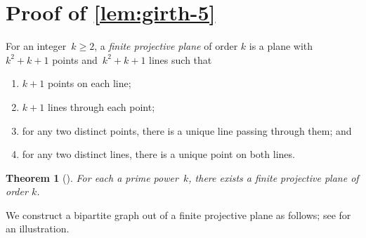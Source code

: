 \documentclass[a4paper,cleveref, autoref, 11pt, fleqn, thm-restate]{article}
\theoremstyle{plain}
\newtheorem{theorem}{Theorem}[section]
\newtheorem{lemma}[theorem]{Lemma}
\begin{document}
\section{Proof of \cref{lem:girth-5}}

For an integer~$k\ge 2$, a \emph{finite projective plane} of order $k$ is a plane with~$k^2+k+1$ points and~$k^2+k+1$ lines such that
\begin{enumerate}[label={(P\arabic*)},left=10pt]
  \item $k+1$ points on each line;
  \item $k+1$ lines through each point;
  \item for any two distinct points, there is a unique line passing through them; and
  \item for any two distinct lines, there is a unique point on both lines.
\end{enumerate}

\begin{theorem}[\cite{kartesziIntroductionFiniteGeometries1976}]%
  For each a prime power~$k$, there exists a finite projective plane of order $k$.
\end{theorem}
We construct a bipartite graph out of a finite projective plane as follows; see  for an illustration.
\end{document}
